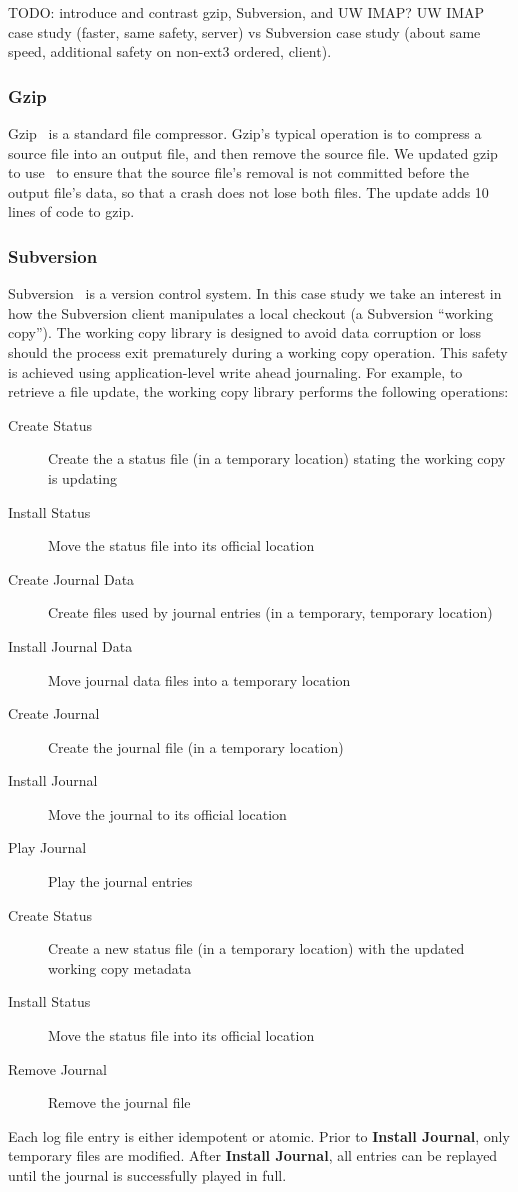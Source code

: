 TODO: introduce and contrast gzip, Subversion, and UW IMAP?
%
UW IMAP case study (faster, same safety, server) vs
Subversion case study (about same speed, additional safety on non-ext3
ordered, client).

\subsubsection{Gzip}
\label{sec:opgroup:gzip}

Gzip~\cite{gzip} is a standard file compressor.
%
Gzip's typical operation is to compress a source file into an output file,
and then remove the source file.
%
We updated gzip to use \opgroups\ to ensure that the source file's
removal is not committed before the output file's data, so that a
crash does not lose both files. The update adds 10 lines of code to
gzip.

\subsubsection{Subversion}
\label{sec:opgroup:svn}

Subversion~\cite{svn} is a version control system.
%
In this case study we take an interest in how the Subversion client
manipulates a local checkout (a Subversion ``working copy'').
%
The working copy library is designed to avoid data corruption or loss
should the process exit prematurely during a working copy operation.
%
This safety is achieved using application-level write ahead
journaling.
%
For example, to retrieve a file update, the working copy library
performs the following operations:
%
\begin{description}
\item[Create Status] Create the a status file (in a temporary location)
  stating the working copy is updating
\item[Install Status] Move the status file into its official location
\item[Create Journal Data] Create files used by journal entries (in a
  temporary, temporary location)
\item[Install Journal Data] Move journal data files into a temporary
  location
\item[Create Journal] Create the journal file (in a temporary location)
\item[Install Journal] Move the journal to its official location
\item[Play Journal] Play the journal entries
\item[Create Status] Create a new status file (in a temporary location)
  with the updated working copy metadata
\item[Install Status] Move the status file into its official location
\item[Remove Journal] Remove the journal file
\end{description}
%
Each log file entry is either idempotent or atomic.
%
Prior to \textbf{Install Journal}, only temporary files are modified.
After \textbf{Install Journal}, all entries can be replayed until the
journal is successfully played in full.

